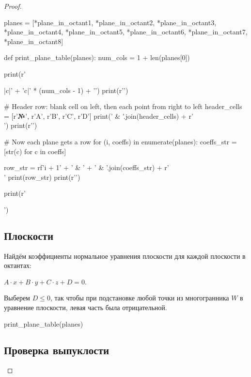 \begin{proof}
\begin{sympycode}
planes = [*plane_in_octant1, *plane_in_octant2, *plane_in_octant3, *plane_in_octant4, *plane_in_octant5, *plane_in_octant6, *plane_in_octant7, *plane_in_octant8]
\end{sympycode}



    \begin{sympycode}
def print_plane_table(planes):
    num_cols = 1 + len(planes[0])

    print(r'\begin{tabular}{|c|' + 'c|' * (num_cols - 1) + '}')
    print(r'\hline')

    # Header row: blank cell on left, then each point from right to left
    header_cells = [r'\textbf{№}', r'A', r'B', r'C', r'D']
    print(' & '.join(header_cells) + r'\\')
    print(r'\hline')

    # Now each plane gets a row
    for (i, coeffs) in enumerate(planes):
        coeffs_str = [str(c) for c in coeffs]

        row_str = rf'{i + 1}' + ' & ' + ' & '.join(coeffs_str) + r'\\'
        print(row_str)
        print(r'\hline')

    print(r'\end{tabular}')    
\end{sympycode}

\vfill

    \subsection*{Плоскости}

    Найдём коэффициенты нормальное уравнения плоскости для каждой плоскости в октантах:

    \(A \cdot x + B \cdot y + C \cdot z + D = 0\).

    Выберем $D \leq 0$, так чтобы при подстановке любой точки из многогранника $W$ в уравнение плоскости, левая часть была отрицательной.\\

    \begin{sympycode}
print_plane_table(planes)
\end{sympycode}
\vfill

    \subsection*{Проверка выпуклости} \hfill


\end{proof}
